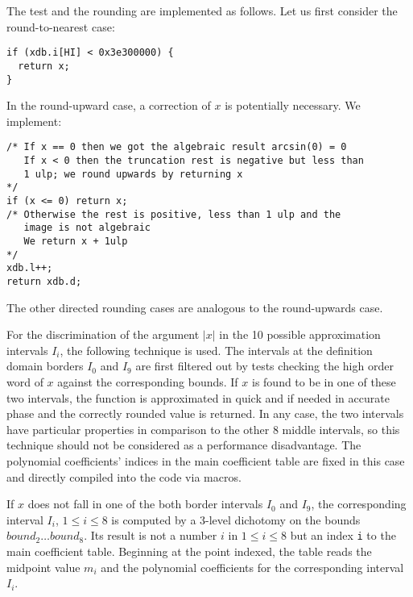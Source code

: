The test and the rounding are implemented as follows. Let us first
consider the round-to-nearest case:
\begin{lstlisting}[caption={Handling special cases - rounding (to nearest)},firstnumber=1]
if (xdb.i[HI] < 0x3e300000) {
  return x;
}
\end{lstlisting}
In the round-upward case, a correction of $x$ is potentially
necessary. We implement:
\begin{lstlisting}[caption={Handling special cases - rounding (upwards)},firstnumber=1]
/* If x == 0 then we got the algebraic result arcsin(0) = 0
   If x < 0 then the truncation rest is negative but less than 
   1 ulp; we round upwards by returning x
*/
if (x <= 0) return x;
/* Otherwise the rest is positive, less than 1 ulp and the
   image is not algebraic 
   We return x + 1ulp
*/
xdb.l++;
return xdb.d;
\end{lstlisting}
The other directed rounding cases are analogous to the round-upwards
case.

For the discrimination of the argument $\left \vert x \right \vert$ in
the 10 possible approximation intervals $I_i$, the following technique
is used. The intervals at the definition domain borders $I_0$ and
$I_9$ are first filtered out by tests checking the high order word of
$x$ against the corresponding bounds. If $x$ is found to be in one of
these two intervals, the function is approximated in quick and if
needed in accurate phase and the correctly rounded value is
returned. In any case, the two intervals have particular properties in
comparison to the other 8 middle intervals, so this technique should
not be considered as a performance disadvantage. The polynomial
coefficients' indices in the main coefficient table are fixed in this
case and directly compiled into the code via macros.

If $x$ does not fall in one of the both border intervals $I_0$ and
$I_9$, the corresponding interval $I_i$, $1 \leq i \leq 8$ is computed
by a 3-level dichotomy on the bounds $bound_2 \dots bound_8$.  Its
result is not a number $i$ in $1 \leq i \leq 8$ but an index {\tt i}
to the main coefficient table. Beginning at the point indexed, the
table reads the midpoint value $m_i$ and the polynomial coefficients
for the corresponding interval $I_i$. 


